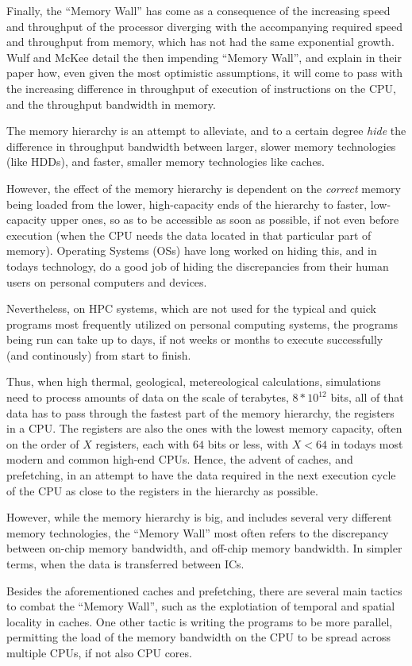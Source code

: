 Finally, the ``Memory Wall'' has come as a consequence of the increasing speed and throughput of the processor diverging with the accompanying required speed and throughput from memory, which has not had the same exponential growth.
Wulf and McKee\cite{Wulf:1995:HMW:216585.216588} detail the then impending ``Memory Wall'', and explain in their paper how, even given the most optimistic assumptions, it will come to pass with the increasing difference in throughput of execution of instructions on the CPU, and the throughput bandwidth in memory.

The memory hierarchy is an attempt to alleviate, and to a certain degree \textit{hide} the difference in throughput bandwidth between larger, slower memory technologies (like HDDs), and faster, smaller memory technologies like caches.

However, the effect of the memory hierarchy is dependent on the \textit{correct} memory being loaded from the lower, high-capacity ends of the hierarchy to faster, low-capacity upper ones, so as to be accessible as soon as possible, if not even before execution (when the CPU needs the data located in that particular part of memory).
Operating Systems (OSs) have long worked on hiding this, and in todays technology, do a good job of hiding the discrepancies from their human users on personal computers and devices.

Nevertheless, on HPC systems, which are not used for the typical and quick programs most frequently utilized on personal computing systems, the programs being run can take up to days, if not weeks or months to execute successfully (and continously) from start to finish.

Thus, when high thermal, geological, metereological calculations, simulations need to process amounts of data on the scale of terabytes, $8*10^{12}$ bits, all of that data has to pass through the fastest part of the memory hierarchy, the registers in a CPU.
The registers are also the ones with the lowest memory capacity, often on the order of $X$ registers, each with $64$ bits or less, with $X < 64$ in todays most modern and common high-end CPUs.
Hence, the advent of caches, and prefetching, in an attempt to have the data required in the next execution cycle of the CPU as close to the registers in the hierarchy as possible.

However, while the memory hierarchy is big, and includes several very different memory technologies, the ``Memory Wall'' most often refers to the discrepancy between on-chip memory bandwidth, and off-chip memory bandwidth.
In simpler terms, when the data is transferred between ICs.

Besides the aforementioned caches and prefetching, there are several main tactics to combat the ``Memory Wall'', such as the explotiation of temporal and spatial locality in caches. One other tactic is writing the programs to be more parallel, permitting the load of the memory bandwidth on the CPU to be spread across multiple CPUs, if not also CPU cores.
